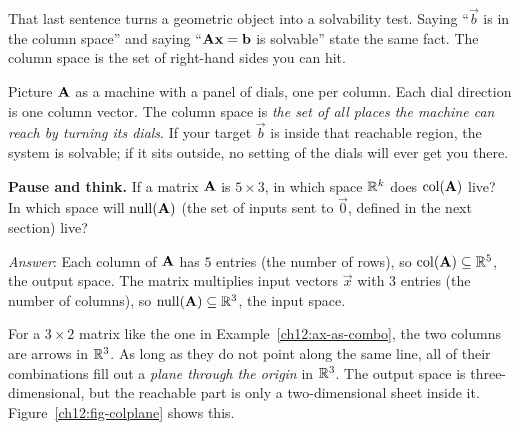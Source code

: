 That last sentence turns a geometric object
into a solvability test. Saying ``$\vec{b}$ is in the column space'' and saying
``$\mathbf{A}\mathbf{x} = \mathbf{b}$ is solvable'' state the same
fact. The column space is the set of right-hand sides you can hit.

\begin{intuitionbox}
Picture $\mathbf{A}$ as a machine with a panel of dials, one per column. Each dial
direction is one column vector. The column space is \emph{the set of all places
the machine can reach by turning its dials}. If your target $\vec{b}$ is inside
that reachable region, the system is solvable; if it sits outside, no setting of
the dials will ever get you there.
\end{intuitionbox}

\begin{recoverybox}
\textbf{Pause and think.} If a matrix $\mathbf{A}$ is $5\times 3$, in which space $\mathbb{R}^k$ does $\operatorname{col}(\mathbf{A})$ live? In which space will $\operatorname{null}(\mathbf{A})$ (the set of inputs sent to $\vec{0}$, defined in the next section) live?
\smallskip

\emph{Answer}: Each column of $\mathbf{A}$ has $5$ entries (the number of rows), so $\operatorname{col}(\mathbf{A})\subseteq \mathbb{R}^5$, the output space. The matrix multiplies input vectors $\vec{x}$ with $3$ entries (the number of columns), so $\operatorname{null}(\mathbf{A})\subseteq \mathbb{R}^3$, the input space.
\end{recoverybox}

For a $3\times 2$ matrix like the one in Example~\ref{ch12:ax-as-combo}, the two
columns are arrows in $\mathbb{R}^3$. As long as they do not point along the same line,
all of their combinations fill out a \emph{plane through the origin} in $\mathbb{R}^3$.
The output space is three-dimensional, but the reachable part is only a
two-dimensional sheet inside it. Figure~\ref{ch12:fig-colplane} shows this.

